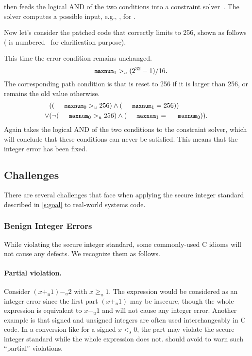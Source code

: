 \sys then feeds the logical AND of the two conditions into a
constraint solver~\cite{boolector}.  The solver computes a possible
input, e.g., , for .

Now let's consider the patched code that correctly limits 
to 256, shown as follows ( is
numbered~\cite[\chapterautorefname~8.11]{whale} for clarification
purpose).

This time the error condition remains unchanged.
\begin{equation*}
\cc{maxnum}_1 >_u (2^{32} - 1) / 16.
\end{equation*}
The corresponding path condition is that  is reset to 256
if it is larger than 256, or remains the old value otherwise.
\begin{align*}
& ((\cc{maxnum}_0 >_u 256) \land (\cc{maxnum}_1 = 256)) \\
\lor
& (\neg (\cc{maxnum}_0 >_u 256) \land (\cc{maxnum}_1 = \cc{maxnum}_0)).
\end{align*}
Again \sys takes the logical AND of the two conditions to the
constraint solver, which will conclude that these conditions can
never be satisfied.  This means that the integer error has been
fixed.

\subsection{Challenges}
\label{s:chal}

There are several challenges that face \sys when applying the
secure integer standard described in \autoref{s:goal} to real-world
systems code.

\subsubsection{Benign Integer Errors}

While violating the secure integer standard, some commonly-used C
idioms will not cause any defects.  We recognize them as follows.

\paragraph{Partial violation.}
Consider $(x +_u 1) -_u 2$ with $x \geq_u 1$.  The expression would
be considered as an integer error since the first part $(x +_u 1)$
may be insecure, though the whole expression is equivalent to $x
-_u 1$ and will not cause any integer error.  Another example is
that signed and unsigned integers are often used interchangeably in
C code.  In a conversion like  for a signed
$x <_s 0$, the part  may violate the secure integer
standard while the whole expression does not.  \sys should avoid
to warn such ``partial'' violations.

